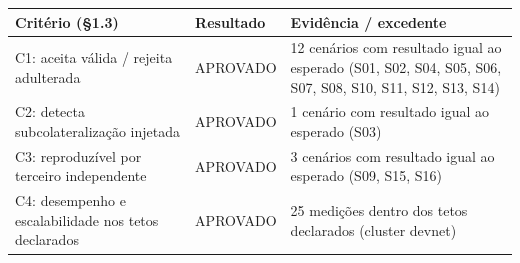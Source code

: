 \begin{tabular}{p{5.5cm} l p{7cm}}
\toprule
\textbf{Critério (\S 1.3)} & \textbf{Resultado} & \textbf{Evidência / excedente} \\
\midrule
C1: aceita válida / rejeita adulterada & APROVADO & 12 cenários com resultado igual ao esperado (S01, S02, S04, S05, S06, S07, S08, S10, S11, S12, S13, S14) \\
C2: detecta subcolateralização injetada & APROVADO & 1 cenário com resultado igual ao esperado (S03) \\
C3: reproduzível por terceiro independente & APROVADO & 3 cenários com resultado igual ao esperado (S09, S15, S16) \\
C4: desempenho e escalabilidade nos tetos declarados & APROVADO & 25 medições dentro dos tetos declarados (cluster devnet) \\
\bottomrule
\end{tabular}
